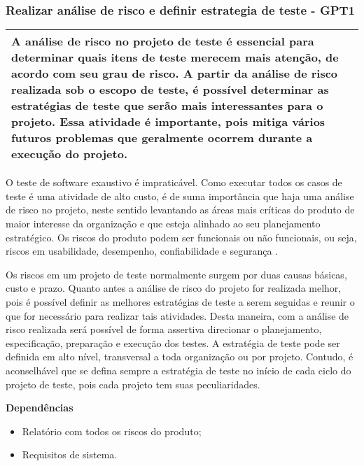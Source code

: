 \subsubsection{Realizar análise de risco e definir estrategia de teste - GPT1}
\label{sec:gpt1}

\begin{table}[H]
\centering
\begin{tabular}{|p{130mm}|}
\hline
A análise de risco no projeto de teste é essencial para determinar quais itens de teste merecem mais atenção, de acordo com seu grau de risco. A partir da análise de risco realizada sob o escopo de teste, é possível determinar as estratégias de teste que serão mais interessantes para o projeto. Essa atividade é importante, pois mitiga vários futuros problemas que geralmente ocorrem durante a execução do projeto. \\
\hline
\end{tabular}
\end{table}

O teste de software exaustivo é impraticável. Como executar todos os casos de teste é uma atividade de alto custo, é de suma importância que haja uma análise de risco no projeto, neste sentido levantando as áreas mais críticas do produto de maior interesse da organização e que esteja alinhado ao seu planejamento estratégico. Os riscos do produto podem ser funcionais ou não funcionais, ou seja, riscos em usabilidade, desempenho, confiabilidade e segurança \cite{GuiaMPTbr}. 

Os riscos em um projeto de teste normalmente surgem por duas causas básicas, custo e prazo. Quanto antes a análise de risco do projeto for realizada melhor, pois é possível definir as melhores estratégias de teste a serem seguidas e reunir o que for necessário para realizar tais atividades. Desta maneira, com a análise de risco realizada será possível de forma assertiva direcionar o planejamento, especificação, preparação e execução dos testes. A estratégia de teste pode ser definida em alto nível, transversal a toda organização ou por projeto. Contudo, é aconselhável que se defina sempre a estratégia de teste no início de cada ciclo do projeto de teste, pois cada projeto tem suas peculiaridades.

\textbf{Dependências}

\begin{itemize}
    \item Relatório com todos os riscos do produto;
    \item Requisitos de sistema.
\end{itemize}

